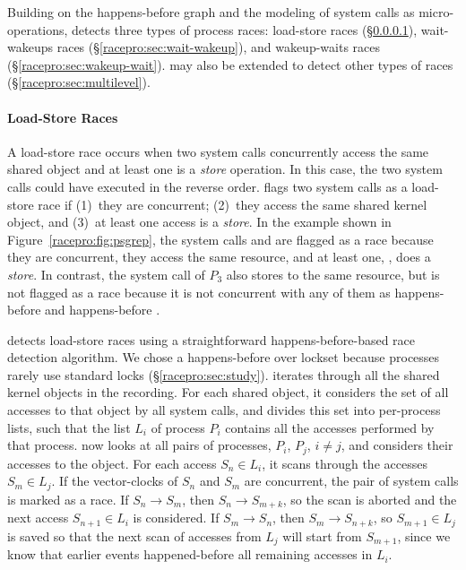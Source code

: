 Building on the happens-before graph and the modeling of system calls
as micro-operations, \racepro detects three types of process races:
load-store races (\S\ref{racepro:sec:load-store}), wait-wakeups races
(\S\ref{racepro:sec:wait-wakeup}), and wakeup-waits races
(\S\ref{racepro:sec:wakeup-wait}).  \racepro may also be extended to detect
other types of races (\S\ref{racepro:sec:multilevel}).

\paragraph{Load-Store Races} \label{racepro:sec:load-store}

A load-store race occurs when two system calls concurrently access the
same shared object and at least one is a \emph{store} operation. In this
case, the two system calls could have executed in the reverse order.
\racepro flags two system calls as a load-store race if (1)~they are
concurrent; (2)~they access the same shared kernel object, and (3)~at
least one access is a \emph{store}. In the 
example shown in Figure~\ref{racepro:fig:psgrep}, the system calls
 and  are flagged as a race because they are
concurrent, they access the same resource, and at least one,
, does a \emph{store}. In contrast, the system call 
 of $P_3$ also stores to the same resource, but is not
flagged as a race because it is not concurrent with any of them as 
 happens-before  and  happens-before
. 

\racepro detects load-store races using a straightforward happens-before-based
race detection algorithm. We chose a happens-before over
lockset because processes rarely use standard locks (\S\ref{racepro:sec:study}). 
\racepro iterates through all the shared kernel objects in the
recording.  For each shared object, it considers the set of all
accesses to that object by all system calls, and divides this set into
per-process lists, such that the list $L_i$ of process $P_i$ contains
all the accesses performed by that process. \racepro now looks at all
pairs of processes, $P_i$, $P_j$, $i \neq j$, and considers their
accesses to the object. For each access $S_n \in L_i$, it scans
through the accesses $S_m \in L_j$.  If the vector-clocks of $S_n$ and
$S_m$ are concurrent, the pair of system calls is marked as a race. If
$S_n \rightarrow S_m$, then $S_n \rightarrow S_{m+k}$, so the scan is
aborted and the next access $S_{n+1} \in L_i$ is considered. If $S_m
\rightarrow S_n$, then $S_m \rightarrow S_{n+k}$, so $S_{m+1} \in L_j$
is saved so that the next scan of accesses from $L_j$ will start from
$S_{m+1}$, since we know that earlier events happened-before all
remaining accesses in $L_i$.

